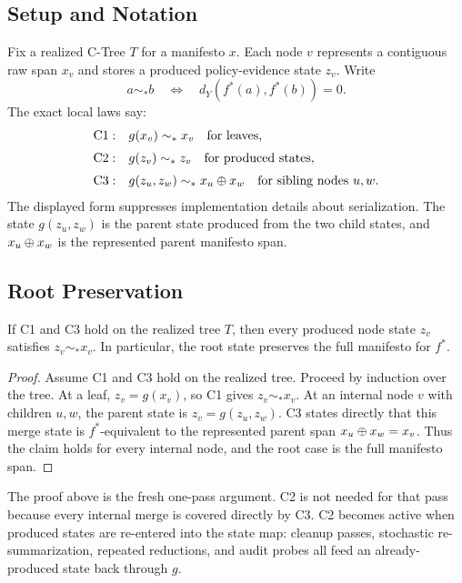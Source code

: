 \subsection{Setup and Notation}

Fix a realized C-Tree \(T\) for a manifesto \(x\). Each node \(v\) represents
a contiguous raw span \(x_v\) and stores a produced policy-evidence state
\(z_v\). Write
\[
  a\sim_\ast b
  \quad\Longleftrightarrow\quad
  d_Y\!\left(f^\ast(a),f^\ast(b)\right)=0 .
\]
The exact local laws say:
\[
\begin{array}{ll}
\mathrm{C1:} & g(x_v)\sim_\ast x_v \quad\text{for leaves},\\[2mm]
\mathrm{C2:} & g(z_v)\sim_\ast z_v \quad\text{for produced states},\\[2mm]
\mathrm{C3:} & g(z_u,z_w)\sim_\ast x_u\oplus x_w
  \quad\text{for sibling nodes }u,w .
\end{array}
\]
The displayed form suppresses implementation details about serialization. The
state \(g(z_u,z_w)\) is the parent state produced from the two child states,
and \(x_u\oplus x_w\) is the represented parent manifesto span.

\subsection{Root Preservation}

\begin{proposition}
\label{prop:v8-all-node-preservation}
If C1 and C3 hold on the realized tree \(T\), then every produced node state
\(z_v\) satisfies \(z_v\sim_\ast x_v\). In particular, the root state
preserves the full manifesto for \(f^\ast\).
\end{proposition}

\begin{proof}
Assume C1 and C3 hold on the realized tree. Proceed by induction over
the tree. At a leaf, \(z_v=g(x_v)\), so C1 gives \(z_v\sim_\ast x_v\).
At an internal node \(v\) with children \(u,w\), the parent state is
\(z_v=g(z_u,z_w)\). C3 states directly that this merge state is
\(f^\ast\)-equivalent to the represented parent span
\(x_u\oplus x_w=x_v\). Thus the claim holds for every internal node,
and the root case is the full manifesto span.
\end{proof}

The proof above is the fresh one-pass argument. C2 is not needed for
that pass because every internal merge is covered directly by C3. C2
becomes active when produced states are re-entered into the state map:
cleanup passes, stochastic re-summarization, repeated reductions, and
audit probes all feed an already-produced state back through \(g\).

